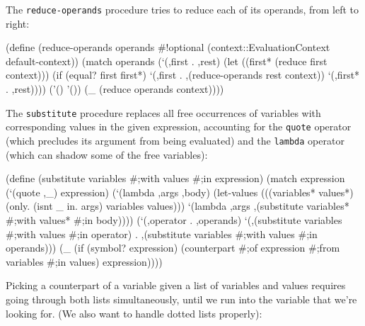 \documentclass[acmsmall]{acmart}
\newenvironment{Snippet}{\Verbatim[samepage=true]}{\endVerbatim}
\begin{document}
The \texttt{reduce-operands} procedure tries to reduce each of its
operands, from left to right:


\begin{Snippet}
(define (reduce-operands operands #!optional (context::EvaluationContext 
                                                         default-context))
  (match operands
    (`(,first . ,rest)
     (let ((first* (reduce first context)))
       (if (equal? first first*)
	   `(,first . ,(reduce-operands rest context))
	   `(,first* . ,rest))))
\end{Snippet}
\begin{Snippet}
    ('()
     '())
\end{Snippet}
\begin{Snippet}
    (_
     (reduce operands context))))
\end{Snippet}

The \texttt{substitute} procedure replaces all free occurrences of variables
with corresponding values in the given expression, accounting for
the \texttt{quote} operator (which precludes its argument from being evaluated)
and the \texttt{lambda} operator (which can shadow some of the free variables):

\begin{Snippet}
(define (substitute variables #;with values #;in expression)
  (match expression
\end{Snippet}
\begin{Snippet}
    (`(quote ,_)
     expression)
\end{Snippet}
\begin{Snippet}
    (`(lambda ,args ,body)
     (let-values (((variables* values*) (only. (isnt _ in. args) variables values)))
       `(lambda ,args
	  ,(substitute variables* #;with values* #;in body))))
\end{Snippet}
\begin{Snippet}
    (`(,operator . ,operands)
     `(,(substitute variables #;with values #;in operator)
       . ,(substitute variables #;with values #;in operands)))
\end{Snippet}
\begin{Snippet}
    (_
     (if (symbol? expression)
	 (counterpart #;of expression #;from variables #;in values)
	 expression))))
\end{Snippet}

Picking a counterpart of a variable given a list of variables and
values requires going through both lists simultaneously, until we run
into the variable that we're looking for. (We also want to handle
dotted lists properly):
\end{document}
